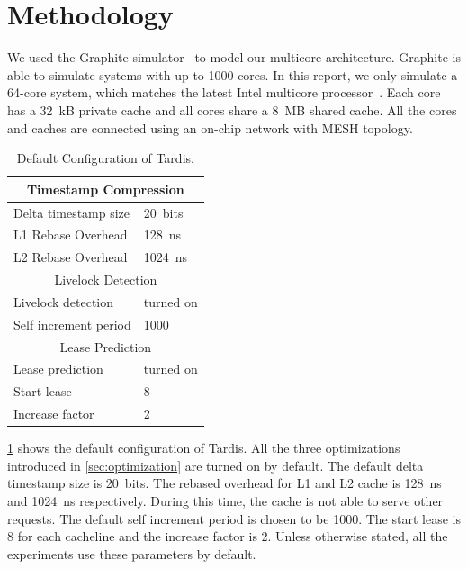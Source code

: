 \documentclass[12pt]{article}
\begin{document}
\section{Methodology}

We used the Graphite simulator~\cite{graphite} to model our multicore 
architecture. Graphite is able to simulate 
systems with up to 1000 cores. In this report, we only simulate a 
64-core system, which matches the latest Intel multicore 
processor~\cite{xeonphi}. Each core has a 32~kB private cache and all 
cores share a 8~MB shared cache. All the cores and caches are 
connected using an on-chip network with MESH topology.

\begin{table}
	\caption{ Default Configuration of Tardis. }
	\begin{center}
	{ 
		\begin{tabular}{|l|l|}
            \hline
			\multicolumn{2}{|c|}{Timestamp Compression} \\
			\hline
			Delta timestamp size 		& 20~bits \\
			L1 Rebase Overhead 			& 128~ns\\
			L2 Rebase Overhead			& 1024~ns \\
			\hline
			\multicolumn{2}{|c|}{Livelock Detection} \\
			\hline
			Livelock detection 			& turned on \\
			Self increment period 		& 1000 \\
			\hline
			\multicolumn{2}{|c|}{Lease Prediction} \\
			\hline
			Lease prediction			& turned on \\
			Start lease 				& 8 \\
			Increase factor				& 2 \\
			\hline
		\end{tabular}
    }
	\end{center}
    \label{tab:system}
	\vspace{-.2in}
\end{table}

\cref{tab:system} shows the default configuration of Tardis. All the 
three optimizations introduced in \cref{sec:optimization} are turned 
on by default. The default delta timestamp size is 20~bits. The
rebased overhead for L1 and L2 cache is 128~ns and 1024~ns 
respectively. During this  time, the cache is not able to serve 
other requests. The default self increment period is chosen to be 
1000. The start lease is 8 for each cacheline and the increase factor 
is 2. Unless otherwise stated, all the experiments use these 
parameters by default.
\end{document}
